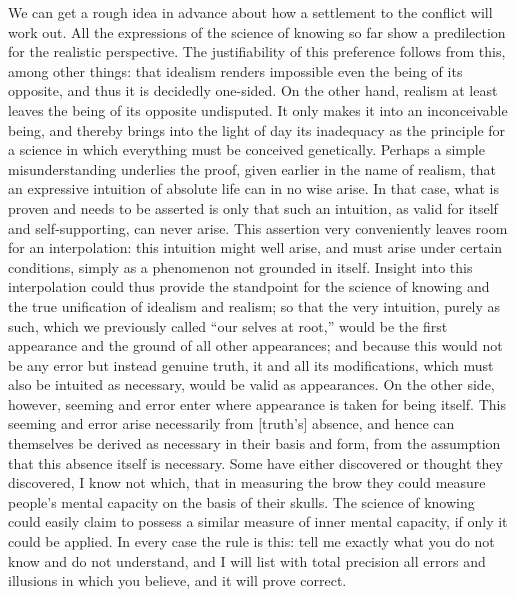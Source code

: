 We can get a rough idea in advance about
how a settlement to the conflict will work out.
All the expressions of the science of knowing so far
show a predilection for the realistic perspective.
The justifiability of this preference follows
from this, among other things:
that idealism renders impossible
even the being of its opposite,
and thus it is decidedly one-sided.
On the other hand, realism at least leaves
the being of its opposite undisputed.
It only makes it into an inconceivable being,
and thereby brings into the light of day
its inadequacy as the principle for a science
in which everything must be conceived genetically.
Perhaps a simple misunderstanding underlies the proof,
given earlier in the name of realism,
that an expressive intuition of
absolute life can in no wise arise.
In that case, what is proven
and needs to be asserted is only that
such an intuition,
as valid for itself and self-supporting,
can never arise.
This assertion very conveniently
leaves room for an interpolation:
this intuition might well arise,
and must arise under certain conditions,
simply as a phenomenon not grounded in itself.
Insight into this interpolation could thus provide
the standpoint for the science of knowing
and the true unification of idealism and realism;
so that the very intuition, purely as such,
which we previously called “our selves at root,”
would be the first appearance
and the ground of all other appearances;
and because this would not be any error
but instead genuine truth,
it and all its modifications,
which must also be intuited as necessary,
would be valid as appearances.
On the other side, however, seeming and error
enter where appearance is taken for being itself.
This seeming and error arise necessarily from [truth's] absence,
and hence can themselves be derived
as necessary in their basis and form,
from the assumption that this absence itself is necessary.
Some have either discovered or thought they discovered,
I know not which, that in measuring the brow
they could measure people's mental capacity
on the basis of their skulls.
The science of knowing could easily claim
to possess a similar measure of inner mental capacity,
if only it could be applied.
In every case the rule is this:
tell me exactly what you do not know
and do not understand,
and I will list with total precision
all errors and illusions in which you believe,
and it will prove correct.
